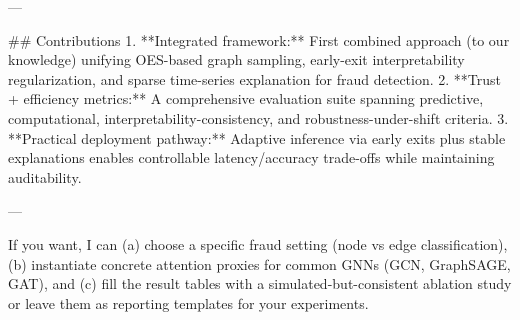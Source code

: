 ---

## Contributions  
1. **Integrated framework:** First combined approach (to our knowledge) unifying OES-based graph sampling, early-exit interpretability regularization, and sparse time-series explanation for fraud detection.  
2. **Trust + efficiency metrics:** A comprehensive evaluation suite spanning predictive, computational, interpretability-consistency, and robustness-under-shift criteria.  
3. **Practical deployment pathway:** Adaptive inference via early exits plus stable explanations enables controllable latency/accuracy trade-offs while maintaining auditability.

---  

If you want, I can (a) choose a specific fraud setting (node vs edge classification), (b) instantiate concrete attention proxies for common GNNs (GCN, GraphSAGE, GAT), and (c) fill the result tables with a simulated-but-consistent ablation study or leave them as reporting templates for your experiments.